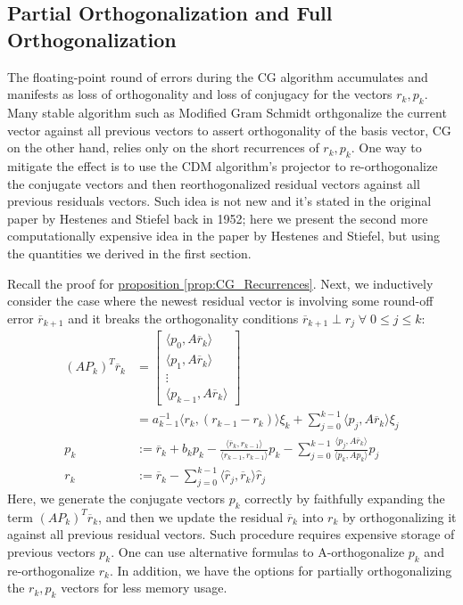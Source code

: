 \documentclass[]{article}
\theoremstyle{definition}
\begin{document}
    \subsection{Partial Orthogonalization and Full Orthogonalization}
        The floating-point round of errors during the CG algorithm accumulates and manifests as loss of orthogonality and loss of conjugacy for the vectors $r_k, p_k$. Many stable algorithm such as Modified Gram Schmidt orthgonalize the current vector against all previous vectors to assert orthogonality of the basis vector, CG on the other hand, relies only on the short recurrences of $r_k, p_k$. One way to mitigate the effect is to use the CDM algorithm's projector to re-orthogonalize the conjugate vectors and then reorthogonalized residual vectors against all previous residuals vectors. Such idea is not new and it's stated in the original paper by Hestenes and Stiefel back in 1952\cite{paper:cg_original}; here we present the second more computationally expensive idea in the paper by Hestenes and Stiefel, but using the quantities we derived in the first section. 
        \par
        Recall the proof for \hyperref[prop:CG_Recurrences]{proposition \ref*{prop:CG_Recurrences}}. Next, we inductively consider the case where the newest residual vector is involving some round-off error $\overline{r}_{k + 1}$ and it breaks the orthogonality conditions $\overline{r}_{k + 1} \perp r_{j} \; \forall \; 0 \le j \le k$: 
        \begin{align}
            (AP_k)^T\overline{r}_k &= 
            \begin{bmatrix}
                \langle p_0, A\overline{r}_k\rangle
                \\
                \langle p_1, A\overline{r}_k\rangle
                \\
                \vdots
                \\
                \langle p_{k - 1}, A\overline{r}_k\rangle
            \end{bmatrix}
            \\
            & = 
            a_{k - 1}^{-1}\langle r_k, (r_{k - 1} - r_k)\rangle\xi_k + \sum_{j = 0}^{k - 1}\langle p_j, A\overline{r}_k\rangle \xi_j
            \\
            p_k &:= \overline{r}_k + b_kp_k - 
                \frac{\langle \overline{r}_k, r_{k -1}\rangle}{\langle r_{k - 1}, r_{k - 1}\rangle}p_k
            - \sum_{j = 0}^{k - 1}\frac{\langle p_j, A\overline{r}_k\rangle}{\langle p_k, Ap_k\rangle}p_j
            \\
            r_k &:= \overline{r}_k - \sum_{j = 0}^{k - 1} \langle \hat{r}_j,\overline{r}_k\rangle \hat{r}_j
        \end{align}
        Here, we generate the conjugate vectors $p_k$ correctly by faithfully expanding the term $(AP_k)^T\overline{r}_k$, and then we update the residual $\overline{r}_k$ into $r_k$ by orthogonalizing it against all previous residual vectors. Such procedure requires expensive storage of previous vectors $p_k$. One can use alternative formulas to A-orthogonalize $p_k$ and re-orthogonalize $r_k$. In addition, we have the options for partially orthogonalizing the $r_k, p_k$ vectors for less memory usage. 
\end{document}
